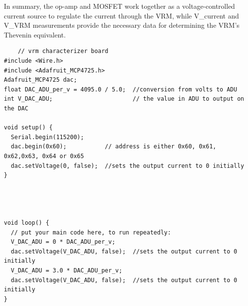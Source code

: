 \documentclass[a4paper,11pt]{article}%
\begin{document}
In summary, the op-amp and MOSFET work together as a voltage-controlled current source to regulate the current through the VRM, while V\_current and V\_VRM measurements provide the necessary data for determining the VRM's Thevenin equivalent.

\begin{lstlisting}
	// vrm characterizer board
#include <Wire.h>
#include <Adafruit_MCP4725.h>
Adafruit_MCP4725 dac;
float DAC_ADU_per_v = 4095.0 / 5.0;  //conversion from volts to ADU
int V_DAC_ADU;                       // the value in ADU to output on the DAC

void setup() {
  Serial.begin(115200);
  dac.begin(0x60);           // address is either 0x60, 0x61, 0x62,0x63, 0x64 or 0x65
  dac.setVoltage(0, false);  //sets the output current to 0 initially
}




void loop() {
  // put your main code here, to run repeatedly:
  V_DAC_ADU = 0 * DAC_ADU_per_v;
  dac.setVoltage(V_DAC_ADU, false);  //sets the output current to 0 initially
  V_DAC_ADU = 3.0 * DAC_ADU_per_v;
  dac.setVoltage(V_DAC_ADU, false);  //sets the output current to 0 initially
}
\end{lstlisting}
\end{document}
